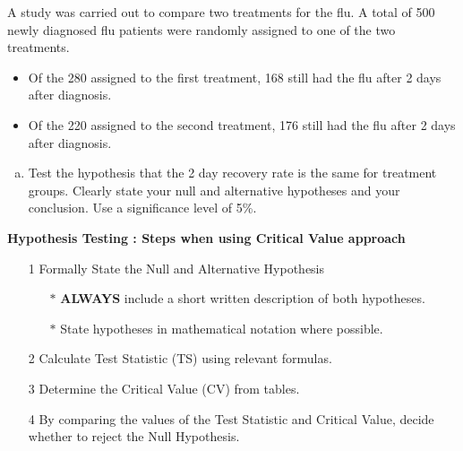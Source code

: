 \documentclass[a4paper,12pt]{article}
\begin{document}
\large 
\noindent 
A study was carried out to compare two treatments for the flu. A total of 500
newly diagnosed flu patients were randomly assigned to one of the two treatments.
\begin{itemize}
	\item Of the 280 assigned to the first treatment, 168 still had the flu after 2 days after
	diagnosis. \item Of the 220 assigned to the second treatment, 176 still had the flu after 2
	days after diagnosis. 
\end{itemize} 
	

\begin{enumerate}[(a)]
\item Test the hypothesis that the 2 day recovery rate is the same for treatment groups. Clearly state your null and alternative hypotheses and your conclusion. Use a significance level of 5\%.
\end{enumerate}

\bigskip

\begin{framed}
		\noindent \textbf{Hypothesis Testing : Steps when using Critical Value approach}
		
		\begin{itemize}
			\item[1] Formally State the Null and Alternative Hypothesis \smallskip
			{
				\begin{itemize}
					\item[$\ast$] \textbf{ALWAYS} include a short written description of both hypotheses.
					\item[$\ast$] State hypotheses in mathematical notation where possible.
					
				\end{itemize}
			}
			\item[2] Calculate Test Statistic (TS) using relevant formulas.\smallskip
			\item[3] Determine the Critical Value (CV) from tables. \smallskip
			\item[4] By comparing the values of the Test Statistic and Critical Value, decide whether to reject the Null Hypothesis.
		\end{itemize}
	\end{framed}
\end{document}
